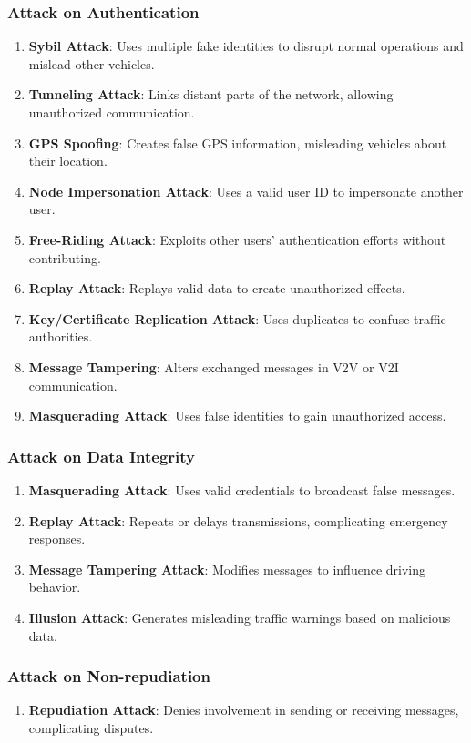 \subsubsection{Attack on Authentication}
\begin{enumerate}
    \item \textbf{Sybil Attack}: Uses multiple fake identities to disrupt normal operations and mislead other vehicles.
    \item \textbf{Tunneling Attack}: Links distant parts of the network, allowing unauthorized communication.
    \item \textbf{GPS Spoofing}: Creates false GPS information, misleading vehicles about their location.
    \item \textbf{Node Impersonation Attack}: Uses a valid user ID to impersonate another user.
    \item \textbf{Free-Riding Attack}: Exploits other users' authentication efforts without contributing.
    \item \textbf{Replay Attack}: Replays valid data to create unauthorized effects.
    \item \textbf{Key/Certificate Replication Attack}: Uses duplicates to confuse traffic authorities.
    \item \textbf{Message Tampering}: Alters exchanged messages in V2V or V2I communication.
    \item \textbf{Masquerading Attack}: Uses false identities to gain unauthorized access.
\end{enumerate}

\subsubsection{Attack on Data Integrity}
\begin{enumerate}
    \item \textbf{Masquerading Attack}: Uses valid credentials to broadcast false messages.
    \item \textbf{Replay Attack}: Repeats or delays transmissions, complicating emergency responses.
    \item \textbf{Message Tampering Attack}: Modifies messages to influence driving behavior.
    \item \textbf{Illusion Attack}: Generates misleading traffic warnings based on malicious data.
\end{enumerate}

\subsubsection{Attack on Non-repudiation}
\begin{enumerate}
    \item \textbf{Repudiation Attack}: Denies involvement in sending or receiving messages, complicating disputes.
\end{enumerate}


